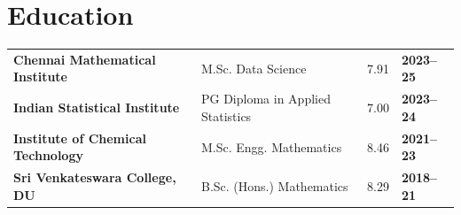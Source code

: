 \documentclass[a4paper,10pt]{article}
\begin{document}
\section{Education}

\begin{tabularx}{\linewidth}{@{}l@{\qquad $\mid$} @{\qquad}l@{\qquad $\mid$} @{\qquad }c@{\qquad $\mid$} @{\qquad}>{\raggedright\arraybackslash}X@{}}
\textbf{Chennai Mathematical Institute} & M.Sc. Data Science & 7.91 & \textbf{2023--25}\\[3pt]
\textbf{Indian Statistical Institute} & PG Diploma in Applied Statistics & 7.00 & \textbf{2023--24}\\[3pt]
\textbf{Institute of Chemical Technology} & M.Sc. Engg. Mathematics & 8.46 & \textbf{2021--23}\\[3pt]
\textbf{Sri Venkateswara College, DU} & B.Sc. (Hons.) Mathematics & 8.29 & \textbf{2018--21}
\end{tabularx}
\end{document}
